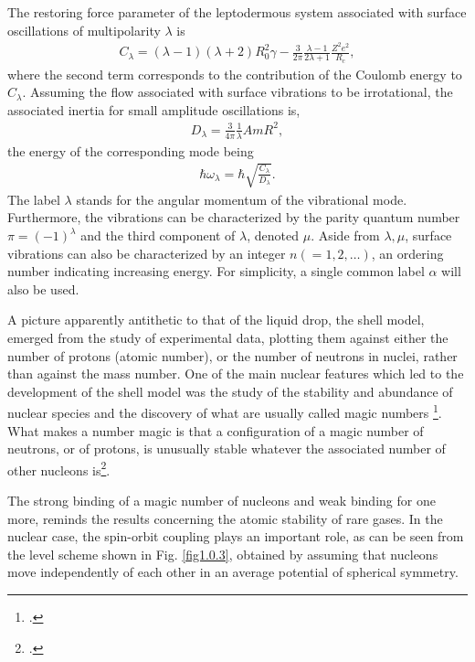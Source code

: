  The restoring force parameter of the leptodermous system associated with surface oscillations of multipolarity $\lambda$ is 
\begin{align}\label{eq1.0.4b}
C_\lambda=(\lambda-1)(\lambda+2)R_0^2\gamma-\frac{3}{2\pi}\frac{\lambda-1}{2\lambda+1}\frac{Z^2e^2}{R_c},
\end{align}
where the second term corresponds to the contribution of the Coulomb energy to $C_\lambda$. Assuming the flow associated with surface vibrations to be irrotational, the associated inertia for small amplitude oscillations is, 
\begin{align}\label{eq1.0.5}
D_{\lambda}=\frac{3}{4\pi}\frac{1}{\lambda}AmR^2,
\end{align}
the energy of the corresponding mode being
\begin{align}\label{eq1.0.6}
\hbar\omega_\lambda=\hbar\sqrt{\frac{C_\lambda}{D_\lambda}}.
\end{align}
The label $\lambda$ stands for the angular momentum of the vibrational mode. Furthermore, the vibrations can be characterized by the parity quantum number $\pi=(-1)^\lambda$ and the third component of $\lambda$, denoted $\mu$. Aside from $\lambda,\mu$, surface vibrations can also be characterized by an integer $n(=1,2,\dots)$, an ordering number indicating increasing energy. For simplicity, a single common label $\alpha$ will  also be used.



A picture apparently antithetic to that of the liquid drop, the shell model, emerged from the study of experimental data, plotting them against either the number of protons (atomic number), or the number of neutrons in  nuclei, rather than against the mass number.
One of the main nuclear features which led to the development of the shell model was the study of the stability and abundance of nuclear species and the discovery of what are usually called magic numbers \footnote{\cite{Elsasser:33,Mayer:48,Haxel:49}.}. What makes a number magic is that a configuration of a magic number of neutrons, or of protons, is unusually stable whatever the associated number of other nucleons is\footnote{\cite{Mayer:49,Mayer:49b}.}.


The strong binding of a magic number of nucleons and weak binding for one more, reminds the results  concerning the atomic stability of rare gases. In the nuclear case,  the spin-orbit coupling plays an important role, as can be seen from the level scheme shown in Fig. \ref{fig1.0.3}, obtained by assuming that nucleons move independently of each other in an average potential  of  spherical symmetry.






